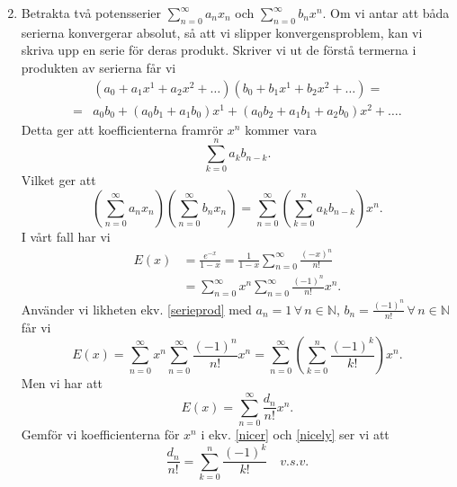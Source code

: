 \documentclass{article}
\begin{document}
\begin{enumerate}[label=(\roman*)]
\[		\] 
	\item
		Betrakta två potensserier $\sum\limits_{n=0}^{\infty} a_n x_n$ och $\sum\limits_{n=0}^{\infty} b_n x^{n}$. Om vi antar att båda serierna konvergerar absolut, så att vi slipper konvergensproblem, kan vi skriva upp en serie för deras produkt. Skriver vi ut de förstå termerna i produkten av serierna får vi
		\begin{align*}
			&\left( a_0 + a_1 x^{1} + a_2 x^2 + \ldots  \right) \left( b_0 + b_1 x^{1} + b_2 x^2 + \ldots \right) = \\
			= &a_0 b_0 + \left( a_0 b_1 + a_1 b_0 \right) x^{1} + \left( a_0 b_2 + a_1 b_1 + a_2 b_0 \right) x^2 + \ldots.
		\end{align*}
		Detta ger att koefficienterna framrör $x^{n}$ kommer vara 
		\[
			\sum\limits_{k=0}^{n} a_k b_{n-k}
		.\] 
		Vilket ger att
		\begin{equation}
			\label{serieprod}
			\left( \sum\limits_{n=0}^{\infty} a_n x_n \right) \left( \sum\limits_{n=0}^{\infty} b_n x_n \right) = \sum\limits_{n=0}^{\infty} \left( \sum\limits_{k=0}^{n} a_k b_{n-k} \right) x^{n}.
		\end{equation}
		I vårt fall har vi
		\begin{align*}
			E(x) &= \frac{e^{-x}}{1-x} = \frac{1}{1-x} \sum\limits_{n=0}^{\infty} \frac{(-x)^{n}}{n!}\\
			     &= \sum\limits_{n=0}^{\infty} x^{n} \sum\limits_{n=0}^{\infty} \frac{(-1)^{n}}{n!} x^{n}.
		\end{align*}
		Använder vi likheten ekv. \ref{serieprod} med $a_n = 1 \, \forall \, n \in \mathbb{N}$, $b_n = \frac{(-1)^{n}}{n!} \, \forall \, n \in \mathbb{N}$ får vi
		\begin{equation}
			\label{nicer}
			E(x) = \sum\limits_{n=0}^{\infty} x^{n} \sum\limits_{n=0}^{\infty} \frac{(-1)^{n}}{n!} x^{n} = \sum\limits_{n=0}^{\infty} \left( \sum\limits_{k=0}^{n} \frac{(-1)^{k}}{k!} \right) x^{n}.
		\end{equation}
		Men vi har att
		\begin{equation}
			\label{nicely}
			E(x) = \sum\limits_{n=0}^{\infty} \frac{d_n}{n!} x^{n}.
		\end{equation}
		Gemför vi koefficienterna för $x^{n}$ i ekv. \ref{nicer} och \ref{nicely} ser vi att
		\[
			\frac{d_n}{n!} = \sum\limits_{k=0}^{n} \frac{(-1)^{k}}{k!} \quad v.s.v.
		\] 

\end{enumerate}
\end{document}
